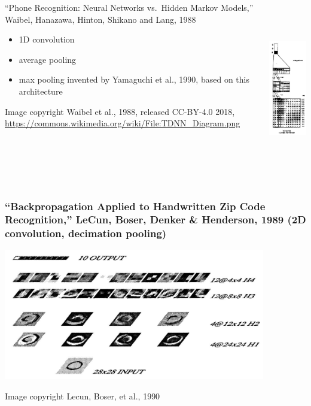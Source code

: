 \documentclass{beamer}
\begin{document}
\begin{frame}
  \begin{columns}
    \column{2in}
    \begin{block}{``Phone Recognition: Neural Networks vs.~Hidden Markov Models,'' Waibel, Hanazawa,
        Hinton, Shikano and Lang, 1988}
      \begin{itemize}
      \item 1D convolution
      \item average pooling
      \item max pooling invented by Yamaguchi et  al., 1990, based on this architecture
      \end{itemize}
      \begin{tiny}
        {
          Image copyright Waibel et al., 1988, released CC-BY-4.0 2018,
          \url{https://commons.wikimedia.org/wiki/File:TDNN_Diagram.png}
          
        }
      \end{tiny}
    \end{block}
    \column{2in}
    \begin{block}{}
      \centerline{\includegraphics[height=3in]{figs/waibel1989.png}}
    \end{block}
  \end{columns}
\end{frame}

\begin{frame}
  \frametitle{``Backpropagation Applied to Handwritten Zip Code
    Recognition,'' LeCun, Boser, Denker \& Henderson, 1989 (2D
    convolution, decimation pooling)}
  \centerline{\includegraphics[width=4.5in]{figs/lecun1990.png}}
  \begin{tiny}Image copyright Lecun, Boser, et al., 1990\end{tiny}
\end{frame}
\end{document}
